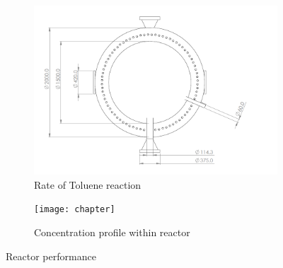 \begin{figure}[p]
    
    \begin{minipage}{\linewidth}
        \centering
        \begin{subfigure}{0.49\linewidth}
            \includegraphics[width=\linewidth, scale=0.5]{chapters/2-reaction/figures/FYD reactor bottom view with calc.PNG}
            \caption{Rate of Toluene reaction}
            \label{fig:comsol-performance:r_TOL}
        \end{subfigure}\hspace{\floatsep}
        \begin{subfigure}{0.49\linewidth}
            \texttt{[image: chapter]}
            \caption{Concentration profile within reactor}
            \label{fig:comsol-performance:concentration}
        \end{subfigure}
        \caption{Reactor performance}
        \label{fig:comsol-performance}
    \end{minipage}
    \vspace{\floatsep}
    
\end{figure}